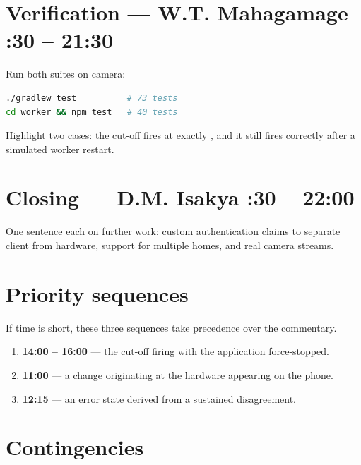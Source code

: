 \documentclass[11pt,a4paper]{article}
\begin{document}
\section{Verification --- W.T. Mahagamage \hfill {}:30 -- 21:30}

Run both suites on camera:

\begin{lstlisting}[language=bash]
./gradlew test          # 73 tests
cd worker && npm test   # 40 tests
\end{lstlisting}

Highlight two cases: the cut-off fires at exactly , and
it still fires correctly after a simulated worker restart.

\section{Closing --- D.M. Isakya \hfill {}:30 -- 22:00}

One sentence each on further work: custom authentication claims to separate
client from hardware, support for multiple homes, and real camera streams.

\newpage
\section*{Priority sequences}

If time is short, these three sequences take precedence over the commentary.

\begin{enumerate}
  \item \textbf{14:00 -- 16:00} --- the cut-off firing with the application
        force-stopped.
  \item \textbf{11:00} --- a change originating at the hardware appearing on the
        phone.
  \item \textbf{12:15} --- an error state derived from a sustained disagreement.
\end{enumerate}

\section*{Contingencies}
\end{document}
